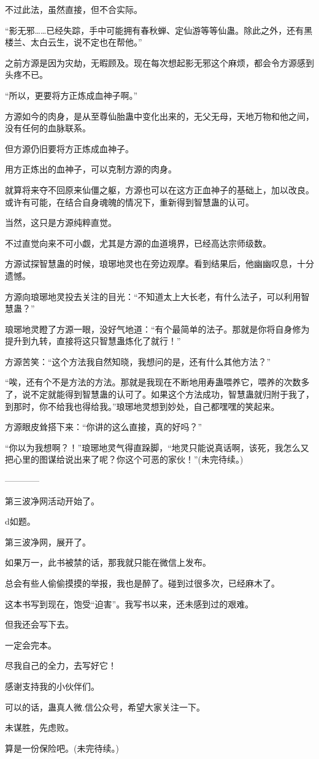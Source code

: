 \begin{this_body}
不过此法，虽然直接，但不合实际。

“影无邪……已经失踪，手中可能拥有春秋蝉、定仙游等等仙蛊。除此之外，还有黑楼兰、太白云生，说不定也在帮他。”

之前方源是因为灾劫，无暇顾及。现在每次想起影无邪这个麻烦，都会令方源感到头疼不已。

“所以，更要将方正炼成血神子啊。”

方源如今的肉身，是从至尊仙胎蛊中变化出来的，无父无母，天地万物和他之间，没有任何的血脉联系。

但方源仍旧要将方正炼成血神子。

用方正炼出的血神子，可以克制方源的肉身。

就算将来夺不回原来仙僵之躯，方源也可以在这方正血神子的基础上，加以改良。或许有可能，在结合自身魂魄的情况下，重新得到智慧蛊的认可。

当然，这只是方源纯粹直觉。

不过直觉向来不可小觑，尤其是方源的血道境界，已经高达宗师级数。

方源试探智慧蛊的时候，琅琊地灵也在旁边观摩。看到结果后，他幽幽叹息，十分遗憾。

方源向琅琊地灵投去关注的目光：“不知道太上大长老，有什么法子，可以利用智慧蛊？”

琅琊地灵瞪了方源一眼，没好气地道：“有个最简单的法子。那就是你将自身修为提升到九转，直接将这只智慧蛊炼化了就行！”

方源苦笑：“这个方法我自然知晓，我想问的是，还有什么其他方法？”

“唉，还有个不是方法的方法。那就是我现在不断地用寿蛊喂养它，喂养的次数多了，说不定就能得到智慧蛊的认可了。如果这个方法成功，智慧蛊就归附于我了，到那时，你不给我也得给我。”琅琊地灵想到妙处，自己都嘿嘿的笑起来。

方源眼皮耸搭下来：“你讲的这么直接，真的好吗？”

“你以为我想啊？！”琅琊地灵气得直跺脚，“地灵只能说真话啊，该死，我怎么又把心里的图谋给说出来了呢？你这个可恶的家伙！”(未完待续。)

------------

第三波净网活动开始了。

d如题。

第三波净网，展开了。

如果万一，此书被禁的话，那我就只能在微信上发布。

总会有些人偷偷摸摸的举报，我也是醉了。碰到过很多次，已经麻木了。

这本书写到现在，饱受“迫害”。我写书以来，还未感到过的艰难。

但我还会写下去。

一定会完本。

尽我自己的全力，去写好它！

感谢支持我的小伙伴们。

可以的话，蛊真人微.信公众号，希望大家关注一下。

未谋胜，先虑败。

算是一份保险吧。(未完待续。)

\end{this_body}

